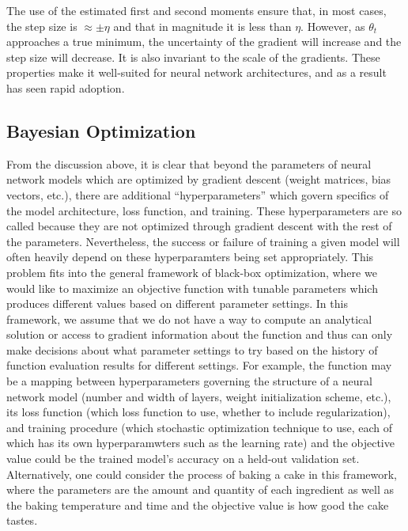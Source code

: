 The use of the estimated first and second moments ensure that, in most cases, the step size is $\approx \pm \eta$ and that in magnitude it is less than $\eta$.
However, as $\theta_t$ approaches a true minimum, the uncertainty of the gradient will increase and the step size will decrease.
It is also invariant to the scale of the gradients.
These properties make it well-suited for neural network architectures, and as a result has seen rapid adoption.

\subsection{Bayesian Optimization}
\label{sec:bayesian_optimization}

From the discussion above, it is clear that beyond the parameters of neural network models which are optimized by gradient descent (weight matrices, bias vectors, etc.), there are additional ``hyperparameters'' which govern specifics of the model architecture, loss function, and training.
These hyperparameters are so called because they are not optimized through gradient descent with the rest of the parameters.
Nevertheless, the success or failure of training a given model will often heavily depend on these hyperparamters being set appropriately.
This problem fits into the general framework of black-box optimization, where we would like to maximize an objective function with tunable parameters which produces different values based on different parameter settings.
In this framework, we assume that we do not have a way to compute an analytical solution or access to gradient information about the function and thus can only make decisions about what parameter settings to try based on the history of function evaluation results for different settings.
For example, the function may be a mapping between hyperparameters governing the structure of a neural network model (number and width of layers, weight initialization scheme, etc.), its loss function (which loss function to use, whether to include regularization), and training procedure (which stochastic optimization technique to use, each of which has its own hyperparamwters such as the learning rate) and the objective value could be the trained model's accuracy on a held-out validation set.
Alternatively, one could consider the process of baking a cake in this framework, where the parameters are the amount and quantity of each ingredient as well as the baking temperature and time and the objective value is how good the cake tastes.


